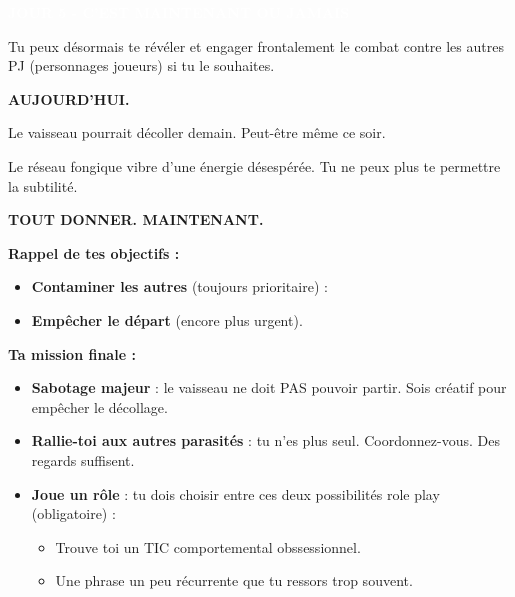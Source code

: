 \documentclass[a4paper,10pt]{article}
\newcommand{\ficheparasite}[1]{
\colorbox{parasitecolor}{\textcolor{white}{\textbf{#1}}}
}
\begin{document}
\noindent
\begin{minipage}[t]{0.48\textwidth}
\raggedright
\ficheparasite{JOUR 5 - C'EST MAINTENANT OU JAMAIS}

\vspace{0.2cm}

Tu peux désormais te révéler et engager frontalement le combat contre les autres PJ (personnages joueurs) si tu le souhaites.

\vspace{0.3cm}

{\Large \textbf{AUJOURD'HUI.}}

\vspace{0.2cm}

Le vaisseau pourrait décoller demain. Peut-être même ce soir.

\vspace{0.2cm}

Le réseau fongique vibre d'une énergie désespérée. Tu ne peux plus te permettre la subtilité.

\vspace{0.2cm}

\textbf{TOUT DONNER. MAINTENANT.}

\vspace{0.2cm}

\textbf{Rappel de tes objectifs :}
\begin{itemize}
\setlength\itemsep{0.1em}
\item \textbf{Contaminer les autres} (toujours prioritaire) :
\item \textbf{Empêcher le départ} (encore plus urgent).
\end{itemize}

\vspace{0.2cm}

\textbf{Ta mission finale :}

\begin{itemize}
\setlength\itemsep{0.1em}
\item \textbf{Sabotage majeur} : le vaisseau ne doit PAS pouvoir partir. Sois créatif pour empêcher le décollage.
\item \textbf{Rallie-toi aux autres parasités} : tu n'es plus seul. Coordonnez-vous. Des regards suffisent.
\item \textbf{Joue un rôle} : tu dois choisir entre ces deux possibilités role play (obligatoire) :
  \begin{itemize}
  \item Trouve toi un TIC comportemental obssessionnel.
  \item Une phrase un peu récurrente que tu ressors trop souvent.
  \end{itemize}
\end{itemize}


\end{minipage}
\end{document}
